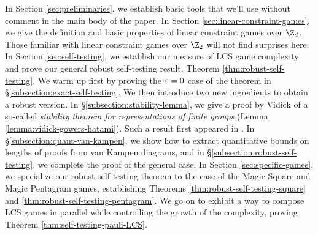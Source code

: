 In Section \ref{sec:preliminaries}, we establish basic tools that we'll use without comment in the main body of the paper. In Section \ref{sec:linear-constraint-games}, we give the definition and basic properties of linear constraint games over $\Z_d$. Those familiar with linear constraint games over $\Z_2$ will not find surprises here. In Section \ref{sec:self-testing}, we establish our measure of LCS game complexity and prove our general robust self-testing result, Theorem \ref{thm:robust-self-testing}. We warm up first by proving the $\varepsilon=0$ case of the theorem in \S\ref{subsection:exact-self-testing}. We then introduce two new ingredients to obtain a robust version. In \S\ref{subsection:stability-lemma}, we give a proof by Vidick \cite{vidick2017approx} of a so-called \emph{stability theorem for representations of finite groups} (Lemma \ref{lemma:vidick-gowers-hatami}). Such a result first appeared in \cite{gowers2015inverse}. In \S\ref{subsection:quant-van-kampen}, we show how to extract quantitative bounds on lengths of proofs from van Kampen diagrams, and in \S\ref{subsection:robust-self-testing}, we complete the proof of the general case. In Section \ref{sec:specific-games}, we specialize our robust self-testing theorem to the case of the Magic Square and Magic Pentagram games, establishing Theorems \ref{thm:robust-self-testing-square} and \ref{thm:robust-self-testing-pentagram}. We go on to exhibit a way to compose LCS games in parallel while controlling the growth of the complexity, proving Theorem \ref{thm:self-testing-pauli-LCS}.
